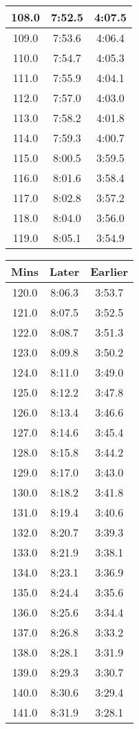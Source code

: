 \begin{footnotesize}
\begin{minipage}{0.25\textwidth}
\begin{tabular}[t]{c|c|c}
	108.0&7:52.5&4:07.5\\\hline
	109.0&7:53.6&4:06.4\\\hline
	110.0&7:54.7&4:05.3\\\hline
	111.0&7:55.9&4:04.1\\\hline
	112.0&7:57.0&4:03.0\\\hline
	113.0&7:58.2&4:01.8\\\hline
	114.0&7:59.3&4:00.7\\\hline
	115.0&8:00.5&3:59.5\\\hline
	116.0&8:01.6&3:58.4\\\hline
	117.0&8:02.8&3:57.2\\\hline
	118.0&8:04.0&3:56.0\\\hline
	119.0&8:05.1&3:54.9\\\hline
		\end{tabular}\end{minipage}
\begin{minipage}{0.25\textwidth}\begin{tabular}[t]{c|c|c}
			Mins&Later&Earlier\\\hline
	120.0&8:06.3&3:53.7\\\hline
	121.0&8:07.5&3:52.5\\\hline
	122.0&8:08.7&3:51.3\\\hline
	123.0&8:09.8&3:50.2\\\hline
	124.0&8:11.0&3:49.0\\\hline
	125.0&8:12.2&3:47.8\\\hline
	126.0&8:13.4&3:46.6\\\hline
	127.0&8:14.6&3:45.4\\\hline
	128.0&8:15.8&3:44.2\\\hline
	129.0&8:17.0&3:43.0\\\hline
	130.0&8:18.2&3:41.8\\\hline
	131.0&8:19.4&3:40.6\\\hline
	132.0&8:20.7&3:39.3\\\hline
	133.0&8:21.9&3:38.1\\\hline
	134.0&8:23.1&3:36.9\\\hline
	135.0&8:24.4&3:35.6\\\hline
	136.0&8:25.6&3:34.4\\\hline
	137.0&8:26.8&3:33.2\\\hline
	138.0&8:28.1&3:31.9\\\hline
	139.0&8:29.3&3:30.7\\\hline
	140.0&8:30.6&3:29.4\\\hline
	141.0&8:31.9&3:28.1\\\hline

\end{tabular}
\end{minipage}
\end{footnotesize}
